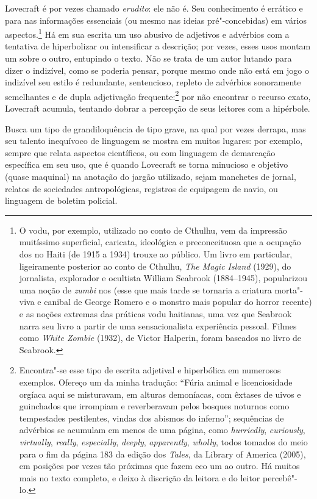 Lovecraft é por vezes chamado \emph{erudito}: ele não é. Seu
conhecimento é errático e para nas informações essenciais (ou mesmo nas
ideias pré"-concebidas) em vários aspectos.\footnote{O vodu, por exemplo,
  utilizado no conto de Cthulhu, vem da impressão muitíssimo
  superficial, caricata, ideológica e preconceituosa que a ocupação dos
   no Haiti (de 1915 a 1934) trouxe ao público. Um livro em
  particular, ligeiramente posterior ao conto de Cthulhu, \emph{The
  Magic Island} (1929), do jornalista, explorador e ocultista William
  Seabrook (1884--1945), popularizou uma noção de \emph{zumbi} nos 
  (esse que mais tarde se tornaria a criatura morta"-viva e canibal de
  George Romero e o monstro mais popular do horror recente) e as noções
  extremas das práticas vodu haitianas, uma vez que Seabrook narra seu
  livro a partir de uma sensacionalista experiência pessoal. Filmes como
  \emph{White Zombie} (1932), de Victor Halperin, foram baseados no
  livro de Seabrook.} Há em sua escrita um uso abusivo de adjetivos e
advérbios com a tentativa de hiperbolizar ou intensificar a descrição;
por vezes, esses usos montam um sobre o outro, entupindo o texto. Não se
trata de um autor lutando para dizer o indizível, como se poderia
pensar, porque mesmo onde não está em jogo o indizível seu estilo é
redundante, sentencioso, repleto de advérbios sonoramente semelhantes e
de dupla adjetivação frequente:\footnote{Encontra"-se esse tipo de escrita
  adjetival e hiperbólica em numerosos exemplos. Ofereço um da minha
  tradução: ``Fúria animal e licenciosidade orgíaca aqui se misturavam,
  em alturas demoníacas, com êxtases de uivos e guinchados que irrompiam
  e reverberavam pelos bosques noturnos como tempestades pestilentes,
  vindas dos abismos do inferno''; sequências de advérbios se acumulam
  em menos de uma página, como \emph{hurriedly}, \emph{curiously},
  \emph{virtually}, \emph{really}, \emph{especially}, \emph{deeply},
  \emph{apparently}, \emph{wholly}, todos tomados do meio para o fim da
  página 183 da edição dos \emph{Tales}, da Library of America (2005),
  em posições por vezes tão próximas que fazem eco um ao outro. Há
  muitos mais no texto completo, e deixo à discrição da leitora e do
  leitor percebê"-lo.} por não encontrar o recurso exato, Lovecraft
acumula, tentando dobrar a percepção de seus leitores com a hipérbole.

Busca um tipo de grandiloquência de tipo grave, na qual por vezes
derrapa, mas seu talento inequívoco de linguagem se mostra em muitos
lugares: por exemplo, sempre que relata aspectos científicos, ou com
linguagem de demarcação específica em seu uso, que é quando Lovecraft se
torna minucioso e objetivo (quase maquinal) na anotação do jargão
utilizado, sejam manchetes de jornal, relatos de sociedades
antropológicas, registros de equipagem de navio, ou linguagem de boletim
policial.

